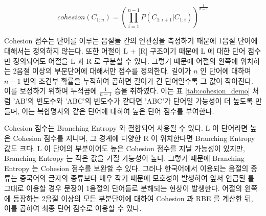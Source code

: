 \documentclass[11pt]{article}
\begin{document}
\begin{equation}
\label{eq:cohesion}
cohesion(C_{1:n}) = \left( \prod_{i=1}^{n-1} P(C_{1:i+1} \vert C_{1:i}) \right) ^ {\frac{1}{n-1}} 
\end{equation}

Cohesion 점수는 단어를 이루는 음절들 간의 연관성을 측정하기 때문에 1음절 단어에 대해서는 정의하지 않는다.
또한 어절이 L + [R] 구조이기 때문에 L 에 대한 단어 점수만 정의되어도 어절을 L 과 R 로 구분할 수 있다.
그렇기 때문에 어절의 왼쪽에 위치하는 2음절 이상의 부분단어에 대해서만 점수를 정의한다.
길이가 $n$ 인 단어에 대하여 $n-1$ 번의 조건부 확률을 누적하여 곱하면 길이가 긴 단어일수록 그 값이 작아진다.
이를 보정하기 위하여 누적곱에 $\frac{1}{n-1}$ 승을 취하였다.
이는 표 \ref{tab:cohesion_demo} 처럼 'AB'의 빈도수와 'ABC'의 빈도수가 같다면 'ABC'가 단어일 가능성이 더 높도록 만들며, 이는 복합명사와 같은 단어에 대하여 높은 단어 점수를 부여한다.

\begin{table}[ht]
\centering
\caption{Cohesion 점수와 Branching Entropy 예시}
\label{tab:cohesion_demo}
\end{table}

Cohesion 점수는 Branching Entropy 와 결합되어 사용될 수 있다.
L 이 단어라면 높은 Cohesion 점수를 지니며, 그 경계에 다양한 R 이 위치한다면 Branching Entropy 값도 크다.
L 이 단어의 부분이어도 높은 Cohesion 점수를 지닐 가능성이 있지만, Branching Entropy 는 작은 값을 가질 가능성이 높다.
그렇기 때문에 Branching Entropy 는 Cohesion 점수를 보완할 수 있다.
그러나 한국어에서 이용되는 음절의 종류는 중국어의 글자의 종류보다 매우 작기 때문에 모호성이 발생하여 앞서 언급된 \citep{zhao2008exploiting, feng2004unsupervised} 를 그대로 이용할 경우 문장이 1음절의 단어들로 분해되는 현상이 발생한다.
어절의 왼쪽에 등장하는 2음절 이상의 모든 부분단어에 대하여 Cohesion 과 RBE 를 계산한 뒤, 이를 곱하여 최종 단어 점수로 이용할 수 있다.
\end{document}
